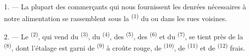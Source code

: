 %
%
%
%
%

\VUsaut{4.0mm}
\VUsaut{3.0mm}

\VUsaut{3.0mm}

1. --- La plupart des commerçants qui nous fournissent les denrées nécessaires à
notre alimentation se rassemblent sous la  \textsuperscript{(1)} du
 ou dans les rues voisines.

2. --- Le  \textsuperscript{(2)}, qui vend du 
\textsuperscript{(3)}, du  \textsuperscript{(4)}, des
 \textsuperscript{(5)}, des 
\textsuperscript{(6)} et du  \textsuperscript{(7)}, se tient près de
la  \textsuperscript{(8)}, dont
l'étalage est garni de  \textsuperscript{(9)} à
croûte rouge, de  \textsuperscript{(10)}, de  \textsuperscript{(11)} et de 
\textsuperscript{(12)} frais.

